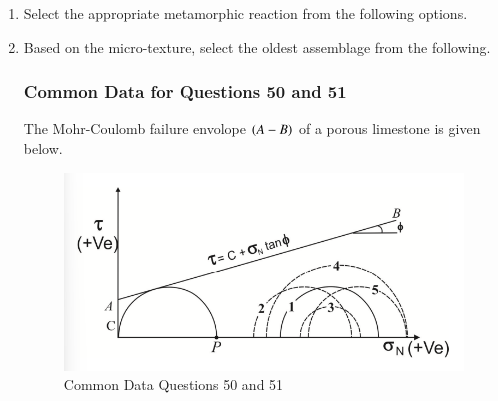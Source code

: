 \documentclass[journal,12pt,onecolumn]{IEEEtran}
\theoremstyle{remark}
\begin{document}
\begin{enumerate}
        \item Select the appropriate metamorphic reaction from the following options. \hfill{}
            \begin{enumerate}
            \end{enumerate}

        \item Based on the micro-texture, select the oldest assemblage from the following. \hfill{}
            \begin{enumerate}
            \end{enumerate}
    \newpage
\subsubsection*{Common Data for Questions 50 and 51}
The Mohr-Coulomb failure envolope $\left(A-B\right)$ of a porous limestone is given below. 

        \begin{figure}[h]
            \centering
            \includegraphics[width=1\columnwidth]{Figs/fig5.png}
            \caption{Common Data Questions 50 and 51}
            \label{fig:placeholder_5}
        \end{figure}


\end{enumerate}
\end{document}

